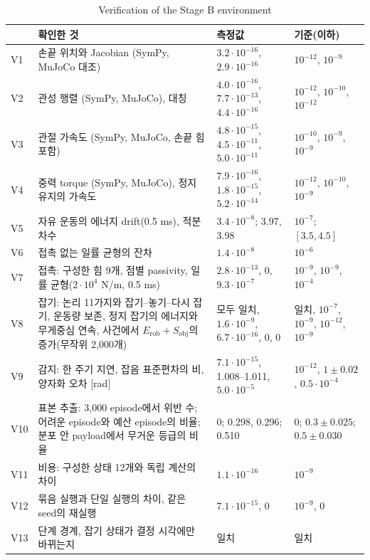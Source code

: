 \documentclass[11pt]{article}\usepackage[margin=1in]{geometry}\usepackage{amsmath,amssymb,amsthm,mathtools}\usepackage{graphicx}\graphicspath{{figures/}{../figures/}{figs/}{./}}\usepackage{enumitem}\usepackage{hyperref}\usepackage{cleveref}\usepackage{tikz}\usetikzlibrary{arrows.meta,positioning,calc,shapes.geometric}\usepackage{float}\usepackage{rotating}\usepackage[most]{tcolorbox}\usepackage{kotex}\usepackage{booktabs}\usepackage{longtable}\emergencystretch=1.6em\tolerance=2000 \crefname{assumption}{Assumption}{Assumptions}\Crefname{assumption}{Assumption}{Assumptions}\crefname{definition}{Definition}{Definitions}\Crefname{definition}{Definition}{Definitions}\crefname{proposition}{Proposition}{Propositions}\Crefname{proposition}{Proposition}{Propositions}\crefname{fact}{Fact}{Facts}\Crefname{fact}{Fact}{Facts} \newtheorem{assumption}{Assumption}\newtheorem{definition}{Definition}\newtheorem{lemma}{Lemma}\newtheorem{proposition}{Proposition}\newtheorem{theorem}{Theorem}\newtheorem{corollary}{Corollary}\newtheorem{fact}{Fact}\theoremstyle{remark}\newtheorem{remark}{Remark} \newcommand{\R}{\mathbb{R}}\newcommand{\xb}{\bar x}\newcommand{\Ab}{\bar A}\newcommand{\By}{\bar B_y}\newcommand{\U}{\mathcal U}\newcommand{\Z}{\mathcal Z}
\begin{document}
\begin{table}[H]
\centering\footnotesize
\caption{Verification of the Stage B environment}
\label{tab:envcheck}
\begin{tabular}{p{0.6cm}p{5.8cm}p{4.9cm}p{3.5cm}}
\toprule
 & 확인한 것 & 측정값 & 기준(이하) \\
\midrule
V1 & 손끝 위치와 Jacobian (SymPy, MuJoCo 대조) & $3.2\cdot10^{-16}$, $2.9\cdot10^{-16}$ & $10^{-12}$, $10^{-9}$ \\
V2 & 관성 행렬 (SymPy, MuJoCo), 대칭 & $4.0\cdot10^{-16}$, $7.7\cdot10^{-13}$, $4.4\cdot10^{-16}$ & $10^{-12}$, $10^{-10}$, $10^{-12}$ \\
V3 & 관절 가속도 (SymPy, MuJoCo, 손끝 힘 포함) & $4.8\cdot10^{-15}$, $4.5\cdot10^{-11}$, $5.0\cdot10^{-11}$ & $10^{-10}$, $10^{-9}$, $10^{-9}$ \\
V4 & 중력 torque (SymPy, MuJoCo), 정지 유지의 가속도 & $7.9\cdot10^{-16}$, $1.8\cdot10^{-15}$, $5.2\cdot10^{-14}$ & $10^{-12}$, $10^{-10}$, $10^{-9}$ \\
V5 & 자유 운동의 에너지 drift(0.5 ms), 적분 차수 & $3.4\cdot10^{-8}$; 3.97, 3.98 & $10^{-7}$; $[3.5,4.5]$ \\
V6 & 접촉 없는 일률 균형의 잔차 & $1.4\cdot10^{-8}$ & $10^{-6}$ \\
V7 & 접촉: 구성한 힘 9개, 점별 passivity, 일률 균형($2\cdot10^4$ N/m, 0.5 ms) & $2.8\cdot10^{-13}$, $0$, $9.3\cdot10^{-7}$ & $10^{-9}$, $10^{-9}$, $10^{-4}$ \\
V8 & 잡기: 논리 11가지와 잡기--놓기--다시 잡기, 운동량 보존, 정지 잡기의 에너지와 무게중심 연속, 사건에서 $E_{\mathrm{rob}}+S_{\mathrm{obj}}$의 증가(무작위 2{,}000개) & 모두 일치, $1.6\cdot10^{-9}$, $6.7\cdot10^{-16}$, $0$, $0$ & 일치, $10^{-7}$, $10^{-9}$, $10^{-12}$, $10^{-9}$ \\
V9 & 감지: 한 주기 지연, 잡음 표준편차의 비, 양자화 오차 [rad] & $7.1\cdot10^{-15}$, 1.008--1.011, $5.0\cdot10^{-5}$ & $10^{-12}$, $1\pm0.02$, $0.5\cdot10^{-4}$ \\
V10 & 표본 추출: 3{,}000 episode에서 위반 수; 어려운 episode와 예산 episode의 비율; 분포 안 payload에서 무거운 등급의 비율 & 0; 0.298, 0.296; 0.510 & 0; $0.3\pm0.025$; $0.5\pm0.030$ \\
V11 & 비용: 구성한 상태 12개와 독립 계산의 차이 & $1.1\cdot10^{-16}$ & $10^{-9}$ \\
V12 & 묶음 실행과 단일 실행의 차이, 같은 seed의 재실행 & $7.1\cdot10^{-15}$, $0$ & $10^{-9}$, 0 \\
V13 & 단계 경계, 잡기 상태가 결정 시각에만 바뀌는지 & 일치 & 일치 \\

\end{tabular}
\end{table}
\end{document}

